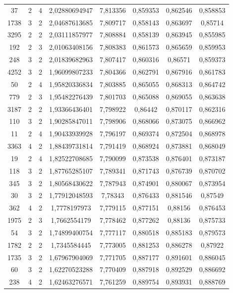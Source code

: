\begin{longtable}{|c|c|c|c|c|c|c|c|}
37 & 2 & 4 & 2,02880694947 & 7,813356 & 0,859353 & 0,862546 & 0,858853 \\
1738 & 3 & 2 & 2,04687613685 & 7,809717 & 0,858143 & 0,863697 & 0,85714 \\
3295 & 2 & 2 & 2,03111857977 & 7,808884 & 0,858139 & 0,863945 & 0,855985 \\
192 & 2 & 3 & 2,01063408156 & 7,808383 & 0,861573 & 0,865659 & 0,859953 \\
248 & 3 & 2 & 2,01839682963 & 7,807417 & 0,860316 & 0,86571 & 0,859373 \\
4252 & 3 & 2 & 1,96099807233 & 7,804366 & 0,862791 & 0,867916 & 0,861783 \\
50 & 2 & 4 & 1,95820336834 & 7,803885 & 0,865055 & 0,868313 & 0,864742 \\
779 & 2 & 3 & 1,95482276439 & 7,801703 & 0,865088 & 0,869055 & 0,863638 \\
3187 & 2 & 2 & 1,93366436401 & 7,798922 & 0,86442 & 0,870117 & 0,862316 \\
110 & 3 & 2 & 1,90285847011 & 7,798906 & 0,868066 & 0,873075 & 0,866962 \\
11 & 2 & 4 & 1,90433939928 & 7,796197 & 0,869374 & 0,872504 & 0,868978 \\
3363 & 4 & 2 & 1,88439731814 & 7,791419 & 0,868924 & 0,873881 & 0,868049 \\
19 & 2 & 4 & 1,82522708685 & 7,790099 & 0,873538 & 0,876401 & 0,873187 \\
118 & 3 & 2 & 1,87765285107 & 7,789341 & 0,871743 & 0,876739 & 0,870702 \\
345 & 3 & 2 & 1,80568430622 & 7,787943 & 0,874901 & 0,880067 & 0,873954 \\
30 & 3 & 2 & 1,77912048593 & 7,78343 & 0,876433 & 0,881546 & 0,87549 \\
362 & 4 & 2 & 1,7778197973 & 7,779115 & 0,877151 & 0,88156 & 0,876453 \\
1975 & 2 & 3 & 1,7662554179 & 7,778462 & 0,877262 & 0,88136 & 0,875733 \\
54 & 3 & 2 & 1,74899400754 & 7,777117 & 0,880518 & 0,885183 & 0,879573 \\
1782 & 2 & 2 & 1,7345584445 & 7,773005 & 0,881253 & 0,886278 & 0,87922 \\
1735 & 3 & 2 & 1,67967904069 & 7,771705 & 0,887177 & 0,891601 & 0,886045 \\
60 & 3 & 2 & 1,62270523288 & 7,770409 & 0,887918 & 0,892529 & 0,886692 \\
238 & 4 & 2 & 1,62463276571 & 7,761259 & 0,889754 & 0,893931 & 0,888769 \\

\end{longtable}

